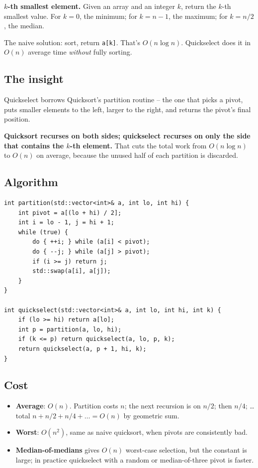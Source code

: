 \documentclass[11pt]{article}
\begin{document}
\begin{defnbox}
\textbf{$k$-th smallest element.} Given an array and an integer $k$, return the $k$-th smallest value. For $k=0$, the minimum; for $k = n-1$, the maximum; for $k = n/2$, the median.
\end{defnbox}

The naive solution: sort, return \texttt{a[k]}. That's $O(n \log n)$. Quickselect does it in $O(n)$ average time \emph{without} fully sorting.

\subsection*{The insight}

Quickselect borrows Quicksort's partition routine -- the one that picks a pivot, puts smaller elements to the left, larger to the right, and returns the pivot's final position.

\begin{ideabox}
\textbf{Quicksort recurses on both sides; quickselect recurses on only the side that contains the $k$-th element.} That cuts the total work from $O(n \log n)$ to $O(n)$ on average, because the unused half of each partition is discarded.
\end{ideabox}

\subsection*{Algorithm}

\begin{lstlisting}[basicstyle=\ttfamily\small,frame=single]
int partition(std::vector<int>& a, int lo, int hi) {
    int pivot = a[(lo + hi) / 2];
    int i = lo - 1, j = hi + 1;
    while (true) {
        do { ++i; } while (a[i] < pivot);
        do { --j; } while (a[j] > pivot);
        if (i >= j) return j;
        std::swap(a[i], a[j]);
    }
}

int quickselect(std::vector<int>& a, int lo, int hi, int k) {
    if (lo >= hi) return a[lo];
    int p = partition(a, lo, hi);
    if (k <= p) return quickselect(a, lo, p, k);
    return quickselect(a, p + 1, hi, k);
}
\end{lstlisting}

\subsection*{Cost}

\begin{itemize}[leftmargin=*]
    \item \textbf{Average}: $O(n)$. Partition costs $n$; the next recursion is on $n/2$; then $n/4$; \ldots total $n + n/2 + n/4 + \ldots = O(n)$ by geometric sum.
    \item \textbf{Worst}: $O(n^2)$, same as naive quicksort, when pivots are consistently bad.
    \item \textbf{Median-of-medians} gives $O(n)$ worst-case selection, but the constant is large; in practice quickselect with a random or median-of-three pivot is faster.
\end{itemize}
\end{document}
